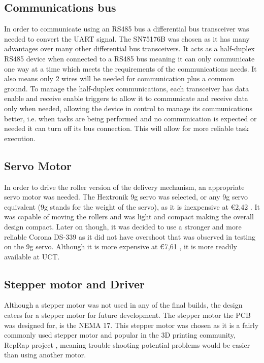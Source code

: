 \documentclass[a4paper,11pt]{article}
\numberwithin{figure}{section}
\numberwithin{table}{section}
\begin{document}
\subsection{Communications bus}
\label{subsec:bus}
In order to communicate using an RS485 bus a differential bus transceiver was needed to convert the UART signal. The SN75176B was chosen as it has many advantages over many other differential bus transceivers. It acts as a half-duplex RS485 device when connected to a RS485 bus meaning it can only communicate one way at a time which meets the requirements of the communications needs. It also means only 2 wires will be needed for communication plus a common ground. To manage the half-duplex communications, each transceiver has data enable and receive enable triggers to allow it to communicate and receive data only when needed, allowing the device in control to manage its communications better, i.e. when tasks are being performed and no communication is expected or needed it can turn off its bus connection. This will allow for more reliable task execution.

\subsection{Servo Motor}
In order to drive the roller version of the delivery mechanism, an appropriate servo motor was needed. The Hextronik 9g servo was selected, or any 9g servo equivalent (9g stands for the weight of the servo), as it is inexpensive at \euro 2,42 \cite{hobbyking}. It was capable of moving the rollers and was light and compact making the overall design compact. Later on though, it was decided to use a stronger and more reliable Corona DS-339 as it did not have overshoot that was observed in testing on the 9g servo. Although it is more expensive at \euro 7,61 \cite{hobbyking}, it is more readily available at UCT.

\subsection{Stepper motor and Driver}
Although a stepper motor was not used in any of the final builds, the design caters for a stepper motor for future development. The stepper motor the PCB was designed for, is the NEMA 17. This stepper motor was chosen as it is a fairly commonly used stepper motor and popular in the 3D printing community, RepRap project \cite{reprap}, meaning trouble shooting potential problems would be easier than using another motor.
\end{document}
